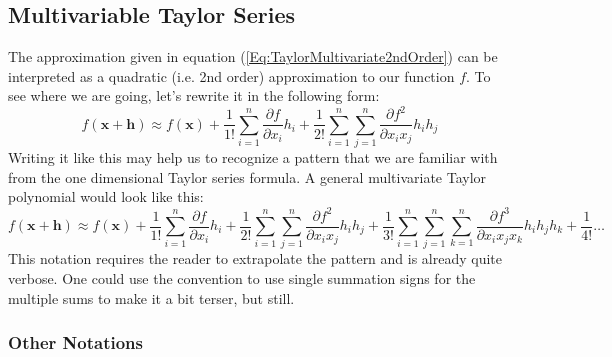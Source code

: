 \subsection{Multivariable Taylor Series} 
The approximation given in equation (\ref{Eq:TaylorMultivariate2ndOrder}) can be interpreted as a quadratic (i.e. 2nd order) approximation to our function $f$. To see where we are going, let's rewrite it in the following form:
\begin{equation}
 f(\mathbf{x + h}) \approx
 f(\mathbf{x}) + 
 \frac{1}{1!} \sum_{i=1}^{n} \frac{\partial f}{\partial x_i} h_i + 
 \frac{1}{2!} \sum_{i=1}^{n} \sum_{j=1}^{n}  \frac{\partial f^2}{\partial x_i x_j} h_i h_j
\end{equation}
Writing it like this may help us to recognize a pattern that we are familiar with from the one dimensional Taylor series formula. A general multivariate Taylor polynomial would look like this:
\begin{equation}
\label{Eq:TaylorSeriesMultiDim}
 f(\mathbf{x + h}) \approx
 f(\mathbf{x}) + 
 \frac{1}{1!} \sum_{i=1}^{n} 
              \frac{\partial f} {\partial x_i} h_i + 
 \frac{1}{2!} \sum_{i=1}^{n} \sum_{j=1}^{n}  
              \frac{\partial f^2}{\partial x_i x_j} h_i h_j +
 \frac{1}{3!} \sum_{i=1}^{n} \sum_{j=1}^{n}  \sum_{k=1}^{n} 
              \frac{\partial f^3}{\partial x_i x_j x_k} h_i h_j h_k + 
 \frac{1}{4!}  \ldots              
\end{equation}
This notation requires the reader to extrapolate the pattern and is already quite verbose. One could use the convention to use single summation signs for the multiple sums to make it a bit terser, but still.


\subsubsection{Other Notations}

